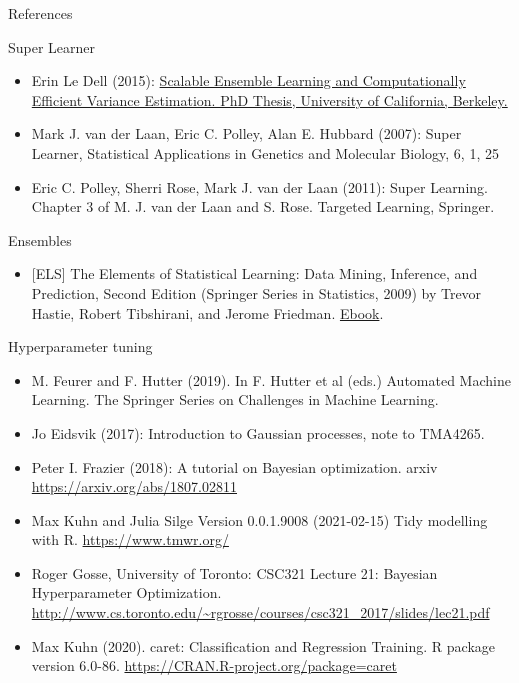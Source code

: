 \documentclass[
  ignorenonframetext,
]{beamer}
\providecommand{\tightlist}{%
  \setlength{\itemsep}{0pt}\setlength{\parskip}{0pt}}
\begin{document}
\begin{frame}{References}
\protect\hypertarget{references}{}
\begin{block}{Super Learner}
\protect\hypertarget{super-learner-1}{}
\begin{itemize}
\item
  Erin Le Dell (2015):
  \href{https://escholarship.org/uc/item/3kb142r2}{Scalable Ensemble
  Learning and Computationally Efficient Variance Estimation. PhD
  Thesis, University of California, Berkeley.}
\item
  Mark J. van der Laan, Eric C. Polley, Alan E. Hubbard (2007): Super
  Learner, Statistical Applications in Genetics and Molecular Biology,
  6, 1, 25
\item
  Eric C. Polley, Sherri Rose, Mark J. van der Laan (2011): Super
  Learning. Chapter 3 of M. J. van der Laan and S. Rose. Targeted
  Learning, Springer.
\end{itemize}
\end{block}

\begin{block}{Ensembles}
\protect\hypertarget{ensembles}{}
\begin{itemize}
\tightlist
\item
  {[}ELS{]} The Elements of Statistical Learning: Data Mining,
  Inference, and Prediction, Second Edition (Springer Series in
  Statistics, 2009) by Trevor Hastie, Robert Tibshirani, and Jerome
  Friedman.
  \href{https://web.stanford.edu/~hastie/Papers/ESLII.pdf}{Ebook}.
\end{itemize}
\end{block}

\begin{block}{Hyperparameter tuning}
\protect\hypertarget{hyperparameter-tuning}{}
\begin{itemize}
\item
  M. Feurer and F. Hutter (2019). In F. Hutter et al (eds.) Automated
  Machine Learning. The Springer Series on Challenges in Machine
  Learning.
\item
  Jo Eidsvik (2017): Introduction to Gaussian processes, note to
  TMA4265.
\item
  Peter I. Frazier (2018): A tutorial on Bayesian optimization. arxiv
  \url{https://arxiv.org/abs/1807.02811}
\item
  Max Kuhn and Julia Silge Version 0.0.1.9008 (2021-02-15) Tidy
  modelling with R. \url{https://www.tmwr.org/}
\item
  Roger Gosse, University of Toronto: CSC321 Lecture 21: Bayesian
  Hyperparameter Optimization.
  \url{http://www.cs.toronto.edu/~rgrosse/courses/csc321_2017/slides/lec21.pdf}
\item
  Max Kuhn (2020). caret: Classification and Regression Training. R
  package version 6.0-86. \url{https://CRAN.R-project.org/package=caret}
\end{itemize}
\end{block}
\end{frame}
\end{document}
